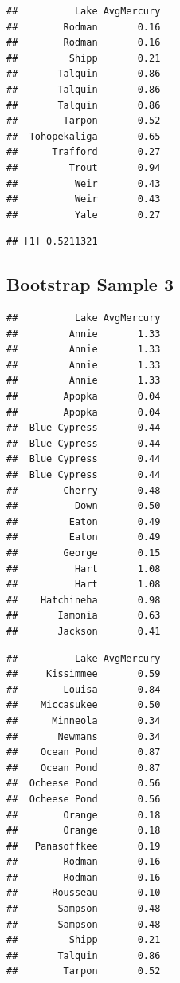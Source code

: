 \documentclass[]{book}
\newenvironment{Shaded}{\begin{snugshade}}{\end{snugshade}}
\newcommand{\KeywordTok}[1]{\textcolor[rgb]{0.13,0.29,0.53}{\textbf{#1}}}
\newcommand{\OperatorTok}[1]{\textcolor[rgb]{0.81,0.36,0.00}{\textbf{#1}}}
\newcommand{\NormalTok}[1]{#1}
\begin{document}
\begin{verbatim}
##          Lake AvgMercury
##        Rodman       0.16
##        Rodman       0.16
##         Shipp       0.21
##       Talquin       0.86
##       Talquin       0.86
##       Talquin       0.86
##        Tarpon       0.52
##  Tohopekaliga       0.65
##      Trafford       0.27
##         Trout       0.94
##          Weir       0.43
##          Weir       0.43
##          Yale       0.27
\end{verbatim}

\begin{Shaded}
\end{Shaded}

\begin{verbatim}
## [1] 0.5211321
\end{verbatim}

\subsection{Bootstrap Sample 3}\label{bootstrap-sample-3}

\begin{verbatim}
##          Lake AvgMercury
##         Annie       1.33
##         Annie       1.33
##         Annie       1.33
##         Annie       1.33
##        Apopka       0.04
##        Apopka       0.04
##  Blue Cypress       0.44
##  Blue Cypress       0.44
##  Blue Cypress       0.44
##  Blue Cypress       0.44
##        Cherry       0.48
##          Down       0.50
##         Eaton       0.49
##         Eaton       0.49
##        George       0.15
##          Hart       1.08
##          Hart       1.08
##    Hatchineha       0.98
##       Iamonia       0.63
##       Jackson       0.41
\end{verbatim}

\begin{verbatim}
##          Lake AvgMercury
##     Kissimmee       0.59
##        Louisa       0.84
##    Miccasukee       0.50
##      Minneola       0.34
##       Newmans       0.34
##    Ocean Pond       0.87
##    Ocean Pond       0.87
##  Ocheese Pond       0.56
##  Ocheese Pond       0.56
##        Orange       0.18
##        Orange       0.18
##   Panasoffkee       0.19
##        Rodman       0.16
##        Rodman       0.16
##      Rousseau       0.10
##       Sampson       0.48
##       Sampson       0.48
##         Shipp       0.21
##       Talquin       0.86
##        Tarpon       0.52
\end{verbatim}
\end{document}
